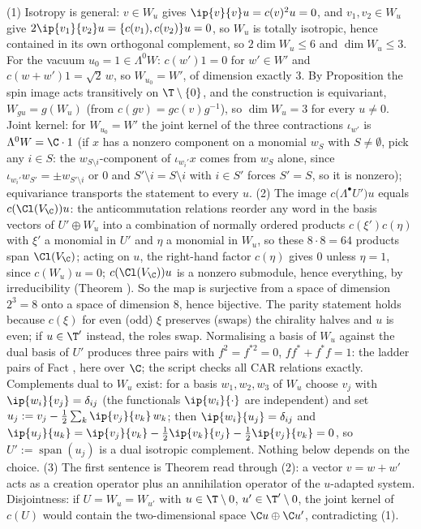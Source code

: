 (1) Isotropy is general: $v \in W_u$ gives $\ip{v}{v}u = c(v)^2u = 0$, and $v_1, v_2 \in W_u$ give $2\ip{v_1}{v_2}u = \{c(v_1), c(v_2)\}u = 0$, so $W_u$ is totally isotropic, hence contained in its own orthogonal complement, so $2\dim W_u \le 6$ and $\dim W_u \le 3$. For the vacuum $u_0 = 1 \in \Lambda^0 W$: $c(w')1 = 0$ for $w' \in W'$ and $c(w+w')1 = \sqrt2\,w$, so $W_{u_0} = W'$, of dimension exactly $3$. By Proposition  the spin image acts transitively on $\T\setminus\{0\}$, and the construction is equivariant, $W_{gu} = g(W_u)$ (from $c(gv) = g c(v) g^{-1}$), so $\dim W_u = 3$ for every $u \neq 0$. Joint kernel: for $W_{u_0} = W'$ the joint kernel of the three contractions $\iota_{w'}$ is $\Lambda^0 W = \C\cdot 1$ (if $x$ has a nonzero component on a monomial $w_S$ with $S \neq \emptyset$, pick any $i \in S$: the $w_{S\setminus i}$-component of $\iota_{w_i'}x$ comes from $w_S$ alone, since $\iota_{w_i'}w_{S'} = \pm w_{S'\setminus i}$ or $0$ and $S'\setminus i = S\setminus i$ with $i \in S'$ forces $S' = S$, so it is nonzero); equivariance transports the statement to every $u$.
(2) The image $c\bigl(\Lambda^\bullet U'\bigr)u$ equals $c(\Cl(V_\C))u$: the anticommutation relations reorder any word in the basis vectors of $U' \oplus W_u$ into a combination of normally ordered products $c(\xi')c(\eta)$ with $\xi'$ a monomial in $U'$ and $\eta$ a monomial in $W_u$, so these $8\cdot 8 = 64$ products span $\Cl(V_\C)$; acting on $u$, the right-hand factor $c(\eta)$ gives $0$ unless $\eta = 1$, since $c(W_u)u = 0$; $c(\Cl(V_\C))u$ is a nonzero submodule, hence everything, by irreducibility (Theorem ). So the map is surjective from a space of dimension $2^3 = 8$ onto a space of dimension $8$, hence bijective. The parity statement holds because $c(\xi)$ for even (odd) $\xi$ preserves (swaps) the chirality halves and $u$ is even; if $u \in \T'$ instead, the roles swap. Normalising a basis of $W_u$ against the dual basis of $U'$ produces three pairs with $f^2 = f^{*2} = 0$, $ff^* + f^*f = 1$: the ladder pairs of Fact , here over $\C$; the script checks all CAR relations exactly. Complements dual to $W_u$ exist: for a basis $w_1, w_2, w_3$ of $W_u$ choose $v_j$ with $\ip{w_i}{v_j} = \delta_{ij}$ (the functionals $\ip{w_i}{\cdot}$ are independent) and set $u_j := v_j - \tfrac12\sum_k \ip{v_j}{v_k}\,w_k$; then $\ip{w_i}{u_j} = \delta_{ij}$ and $\ip{u_j}{u_k} = \ip{v_j}{v_k} - \tfrac12\ip{v_k}{v_j} - \tfrac12\ip{v_j}{v_k} = 0$, so $U' := \operatorname{span}(u_j)$ is a dual isotropic complement. Nothing below depends on the choice.
(3) The first sentence is Theorem  read through (2): a vector $v = w + w'$ acts as a creation operator plus an annihilation operator of the $u$-adapted system. Disjointness: if $U = W_{u} = W_{u'}$ with $u \in \T\setminus 0$, $u' \in \T'\setminus 0$, the joint kernel of $c(U)$ would contain the two-dimensional space $\C u \oplus \C u'$, contradicting (1).
